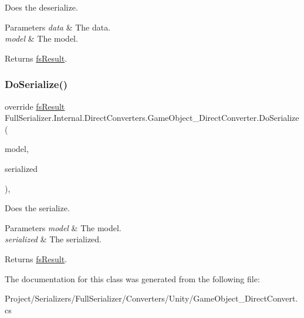 Does the deserialize. 


\begin{DoxyParams}{Parameters}
{\em data} & The data.\\
\hline
{\em model} & The model.\\
\hline
\end{DoxyParams}
\begin{DoxyReturn}{Returns}
\hyperlink{struct_full_serializer_1_1fs_result}{fs\+Result}.
\end{DoxyReturn}
\mbox{\label{class_full_serializer_1_1_internal_1_1_direct_converters_1_1_game_object___direct_converter_a01655c6b3c484d192362db3a30c27a73}} 
\subsubsection{\texorpdfstring{Do\+Serialize()}{DoSerialize()}}
{\footnotesize\ttfamily override \hyperlink{struct_full_serializer_1_1fs_result}{fs\+Result} Full\+Serializer.\+Internal.\+Direct\+Converters.\+Game\+Object\+\_\+\+Direct\+Converter.\+Do\+Serialize (\begin{DoxyParamCaption}\item[{Game\+Object}]{model,  }\item[{Dictionary$<$ string, \hyperlink{class_full_serializer_1_1fs_data}{fs\+Data} $>$}]{serialized }\end{DoxyParamCaption})\hspace{0.3cm}{\ttfamily [inline]}, {\ttfamily [protected]}}



Does the serialize. 


\begin{DoxyParams}{Parameters}
{\em model} & The model.\\
\hline
{\em serialized} & The serialized.\\
\hline
\end{DoxyParams}
\begin{DoxyReturn}{Returns}
\hyperlink{struct_full_serializer_1_1fs_result}{fs\+Result}.
\end{DoxyReturn}


The documentation for this class was generated from the following file\+:\begin{DoxyCompactItemize}
\item 
Project/\+Serializers/\+Full\+Serializer/\+Converters/\+Unity/Game\+Object\+\_\+\+Direct\+Convert.\+cs\end{DoxyCompactItemize}
